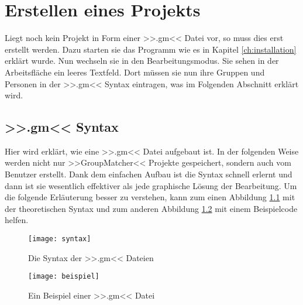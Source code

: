 \chapter{Erstellen eines Projekts}
\label{ch:erstellen_eines_projekts}

Liegt noch kein Projekt in Form einer >>.gm<< Datei vor, so muss dies erst erstellt werden. Dazu starten sie das Programm wie es in Kapitel \ref{ch:installation} erklärt wurde. Nun wechseln sie in den Bearbeitungsmodus. Sie sehen in der Arbeitsfläche ein leeres Textfeld. Dort müssen sie nun ihre Gruppen und Personen in der >>.gm<< Syntax eintragen, was im Folgenden Abschnitt erklärt wird.

\section{>>.gm<< Syntax}
\label{sec:>>.gm<<_syntax}

Hier wird erklärt, wie eine >>.gm<< Datei aufgebaut ist. In der folgenden Weise werden nicht nur >>GroupMatcher<< Projekte gespeichert, sondern auch vom Benutzer erstellt. Dank dem einfachen Aufbau ist die Syntax schnell erlernt und dann ist sie wesentlich effektiver als jede graphische Lösung der Bearbeitung. Um die folgende Erläuterung besser zu verstehen, kann zum einen Abbildung \ref{fig:die_syntax} mit der theoretischen Syntax  und zum anderen Abbildung \ref{fig:ein_beispiel} mit einem Beispielcode helfen.

\begin{figure}
	\texttt{[image: syntax]}
	\caption{Die Syntax der >>.gm<< Dateien}
	\label{fig:die_syntax}
\end{figure}

\begin{figure}
	\texttt{[image: beispiel]}
	\caption{Ein Beispiel einer >>.gm<< Datei}
	\label{fig:ein_beispiel}
\end{figure}

